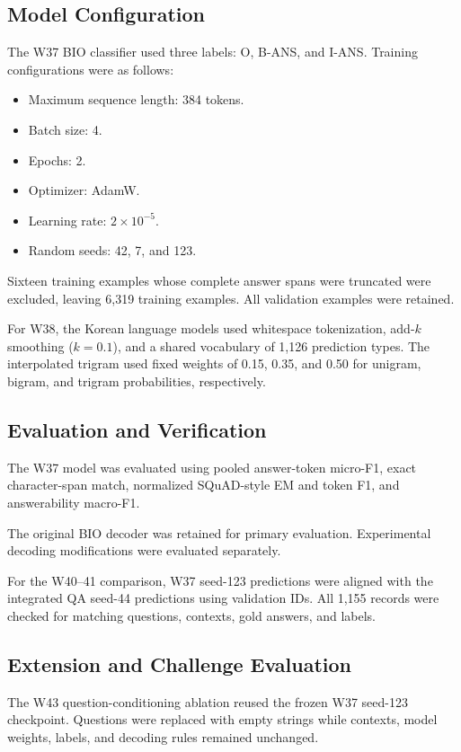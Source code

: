 \documentclass[11pt,a4paper,twocolumn]{article}
\begin{document}
\subsection*{Model Configuration}
The W37 BIO classifier used three labels:
O, B-ANS, and I-ANS. Training configurations
were as follows:

\begin{itemize}
    \item Maximum sequence length: 384 tokens.
    \item Batch size: 4.
    \item Epochs: 2.
    \item Optimizer: AdamW.
    \item Learning rate: $2 \times 10^{-5}$.
    \item Random seeds: 42, 7, and 123.
\end{itemize}

Sixteen training examples whose complete answer
spans were truncated were excluded, leaving 6,319
training examples. All validation examples were
retained.

For W38, the Korean language models used
whitespace tokenization, add-$k$ smoothing
($k=0.1$), and a shared vocabulary of 1,126
prediction types. The interpolated trigram used
fixed weights of 0.15, 0.35, and 0.50 for
unigram, bigram, and trigram probabilities,
respectively.

\subsection*{Evaluation and Verification}
The W37 model was evaluated using pooled
answer-token micro-F1, exact character-span
match, normalized SQuAD-style EM and token F1,
and answerability macro-F1.

The original BIO decoder was retained for
primary evaluation. Experimental decoding
modifications were evaluated separately.

For the W40--41 comparison, W37 seed-123
predictions were aligned with the integrated
QA seed-44 predictions using validation IDs.
All 1,155 records were checked for matching
questions, contexts, gold answers, and labels.

\subsection*{Extension and Challenge Evaluation}
The W43 question-conditioning ablation reused
the frozen W37 seed-123 checkpoint. Questions
were replaced with empty strings while contexts,
model weights, labels, and decoding rules
remained unchanged.
\end{document}
